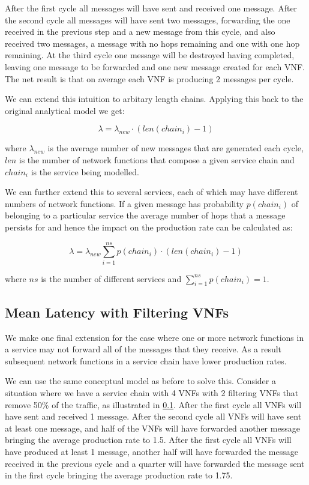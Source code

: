 After the first cycle all messages will have sent and received one message. After the second cycle all messages will have sent two messages, forwarding the one received in the previous step and a new message from this cycle, and also received two messages, a message with no hops remaining and one with one hop remaining. At the third cycle one message will be destroyed having completed, leaving one message to be forwarded and one new message created for each VNF. The net result is that on average each VNF is producing 2 messages per cycle.

We can extend this intuition to arbitary length chains. Applying this back to the original analytical model we get:

\begin{equation}
\lambda = \lambda_{new} \cdot (len(chain_i) - 1)
\end{equation}

where $\lambda_{new}$ is the average number of new messages that are generated each cycle, $len$ is the number of network functions that compose a given service chain and $chain_i$ is the service being modelled.

We can further extend this to several services, each of which may have different numbers of network functions. If a given message has probability $p(chain_i)$ of belonging to a particular service the average number of hops that a message persists for and hence the impact on the production rate can be calculated as:

\begin{equation}
\lambda = \lambda_{new} \sum_{i=1}^{ns} p(chain_i) \cdot (len(chain_i) - 1)
\end{equation}

where $ns$ is the number of different services and $\sum_{i=1}^{ns} p(chain_i) = 1$.

\subsection{Mean Latency with Filtering VNFs}
We make one final extension for the case where one or more network functions in a service may not forward all of the messages that they receive. As a result subsequent network functions in a service chain have lower production rates. 

We can use the same conceptual model as before to solve this. Consider a situation where we have a service chain with 4 VNFs with 2 filtering VNFs that remove 50\% of the traffic, as illustrated in \ref{}. After the first cycle all VNFs will have sent and received 1 message. After the second cycle all VNFs will have sent at least one message, and half of the VNFs will have forwarded another message bringing the average production rate to 1.5. After the first cycle all VNFs will have produced at least 1 message, another half will have forwarded the message received in the previous cycle and a quarter will have forwarded the message sent in the first cycle bringing the average production rate to 1.75.

